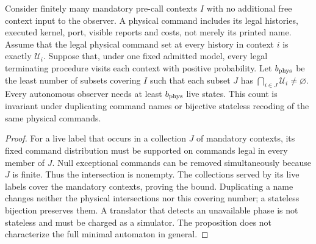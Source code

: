 \begin{proposition}\label{prop:physical}
Consider finitely many mandatory pre-call contexts $I$ with no additional free context input to the observer. A physical command includes its legal histories, executed kernel, port, visible reports and costs, not merely its printed name. Assume that the legal physical command set at every history in context $i$ is exactly $\mathcal U_i$. Suppose that, under one fixed admitted model, every legal terminating procedure visits each context with positive probability. Let $b_{\rm phys}$ be the least number of subsets covering $I$ such that each subset $J$ has $\bigcap_{i\in J}\mathcal U_i\ne\varnothing$. Every autonomous observer needs at least $b_{\rm phys}$ live states. This count is invariant under duplicating command names or bijective stateless recoding of the same physical commands.
\end{proposition}
\begin{proof}
For a live label that occurs in a collection $J$ of mandatory contexts, its fixed command distribution must be supported on commands legal in every member of $J$. Null exceptional commands can be removed simultaneously because $J$ is finite. Thus the intersection is nonempty. The collections served by its live labels cover the mandatory contexts, proving the bound. Duplicating a name changes neither the physical intersections nor this covering number; a stateless bijection preserves them. A translator that detects an unavailable phase is not stateless and must be charged as a simulator. The proposition does not characterize the full minimal automaton in general.
\end{proof}


